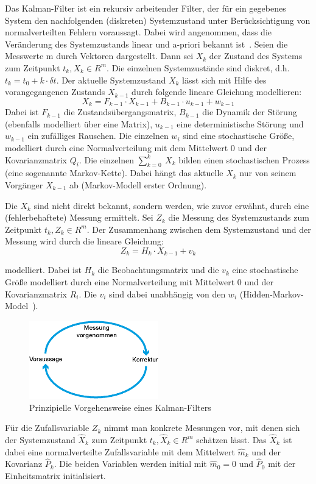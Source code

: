 \documentclass[a4paper, 11pt, twocolumn]{article}
\begin{document}
Das Kalman-Filter ist ein rekursiv arbeitender Filter, der für ein gegebenes System den nachfolgenden (diskreten) Systemzustand unter Berücksichtigung von normalverteilten Fehlern voraussagt. Dabei wird angenommen, dass die Veränderung des Systemzustands linear und a-priori bekannt ist~\cite{Welch1995}. Seien die Messwerte m durch Vektoren dargestellt. Dann sei $X_k$ der Zustand des Systems zum Zeitpunkt $t_k, X_k \in R^m$. Die einzelnen Systemzustände sind diskret, d.h. $t_k = t_0 + k \cdot \delta t$. Der aktuelle Systemzustand $X_k$ lässt sich mit Hilfe des vorangegangenen Zustands $X_{k-1}$ durch folgende lineare Gleichung modellieren:
\[
	X_k = F_{k-1} \cdot X_{k-1} + B_{k-1} \cdot u_{k-1} + w_{k-1}
\]
Dabei ist $F_{k-1}$ die Zustandsübergangsmatrix, $B_{k-1}$ die Dynamik der Störung (ebenfalls modelliert über eine Matrix), $u_{k-1}$ eine deterministische Störung und $w_{k-1}$ ein zufälliges Rauschen. Die einzelnen $w_i$ sind eine stochastische Größe, modelliert durch eine Normalverteilung mit dem Mittelwert 0 und der Kovarianzmatrix $Q_i$. Die einzelnen $\sum_{k=0}^k~X_k$ bilden einen stochastischen Prozess (eine sogenannte Markov-Kette). Dabei hängt das aktuelle $X_k$ nur von seinem Vorgänger $X_{k-1}$ ab (Markov-Modell erster Ordnung).

Die $X_k$ sind nicht direkt bekannt, sondern werden, wie zuvor erwähnt, durch eine (fehlerbehaftete) Messung ermittelt. Sei $Z_k$ die Messung des Systemzustands zum Zeitpunkt $t_k, Z_k \in R^m$. Der Zusammenhang zwischen dem Systemzustand und der Messung wird durch die lineare Gleichung:
\[
	Z_k = H_k \cdot X_{k-1} + v_k
\]

modelliert. Dabei ist $H_k$ die Beobachtungsmatrix und die $v_k$ eine stochastische Größe modelliert durch eine Normalverteilung mit Mittelwert 0 und der Kovarianzmatrix $R_i$. Die $v_i$ sind dabei unabhängig von den $w_i$ (Hidden-Markov-Model~\cite{MarslandBook}). 
\begin{figure}[htpb]
	\centering
	\includegraphics[width=0.5\textwidth]{kalman.eps}
	\caption{Prinzipielle Vorgehensweise eines Kalman-Filters}
	\label{fig:kalman}
\end{figure}
Für die Zufallsvariable $Z_k$ nimmt man konkrete Messungen vor, mit denen sich der Systemzustand $\widehat{X}_k$ zum Zeitpunkt $t_k, \widehat{X}_k \in R^m$ schätzen lässt. Das $\widehat{X}_k$ ist dabei eine normalverteilte Zufallsvariable mit dem Mittelwert $\widehat{m}_k$ und der Kovarianz $\widehat{P}_k$.
Die beiden Variablen werden initial mit $\widehat{m}_0 = 0$ und $\widehat{P}_0$ mit der Einheitsmatrix initialisiert. 
\end{document}
